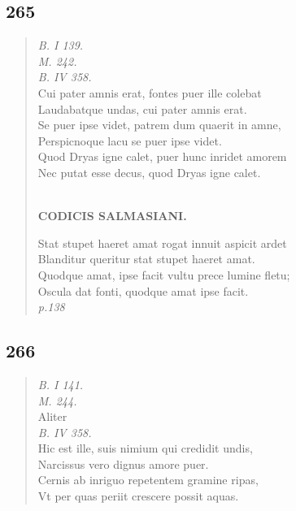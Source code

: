 \documentclass[11pt, a4paper]{report}
\begin{document}
            \subsection*{265}
      \begin{verse}
      \textit{B. I 139.} \\ \textit{M. 242.} \\ \textit{B. IV 358.} \\ Cui pater amnis erat, fontes puer ille colebat \\ Laudabatque undas, cui pater amnis erat. \\ Se puer ipse videt, patrem dum quaerit in amne, \\ Perspicnoque lacu se puer ipse videt. \\ Quod Dryas igne calet, puer hunc inridet amorem \\ Nec putat esse decus, quod Dryas igne calet. \\ 
        ﻿\pagebreak 
    \begin{center} \textbf{CODICIS SALMASIANI.} \end{center} \marginpar{[01]} Stat stupet haeret amat rogat innuit aspicit ardet \\ Blanditur queritur stat stupet haeret amat. \\ Quodque amat, ipse facit vultu prece lumine fletu; \\ Oscula dat fonti, quodque amat ipse facit. \\ \textit{p.138} \\ 
      \end{verse}
  
            \subsection*{266}
      \begin{verse}
      \textit{B. I 141.} \\ \textit{M. 244.} \\  \lbrack Aliter \rbrack  \\ \textit{B. IV 358.} \\ Hic est ille, suis nimium qui credidit undis, \\ Narcissus vero dignus amore puer. \\ Cernis ab inriguo repetentem gramine ripas, \\ Vt per quas periit crescere possit aquas. \\ 
      \end{verse}
  
\end{document}
